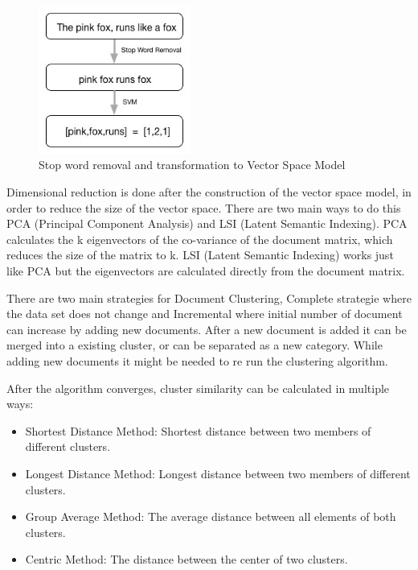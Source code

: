 \begin{figure}
  \begin{center}
    \includegraphics[width=5cm]{images/2_svm.jpg}
  \end{center}
  \caption{ Stop word removal and transformation to Vector Space Model }
  \label{fig:2_svm}
\end{figure}

Dimensional reduction is done after the construction of the vector space model, in order to reduce the size of the vector space. There are two main ways to do this PCA (Principal Component Analysis) and LSI (Latent Semantic Indexing). PCA calculates the k eigenvectors of the co-variance of the document matrix, which reduces the size of the matrix to k. LSI (Latent Semantic Indexing) works just like PCA but the eigenvectors are calculated directly from the document matrix.

There are two main strategies for Document Clustering, Complete strategie where the data set does not change and Incremental where initial number of document can increase by adding new documents. After a new document is added it can be merged into a existing cluster, or can be separated as a new category. While adding new documents it might be needed to re run the clustering algorithm. 

After the algorithm converges, cluster similarity can be calculated in multiple ways:
\begin{itemize}
  \item Shortest Distance Method: Shortest distance between two members of different clusters.
  \item Longest Distance Method: Longest distance between two members of different clusters.
  \item Group Average Method: The average distance between all elements of both clusters.
  \item Centric Method: The distance between the center of two clusters.
\end{itemize}

